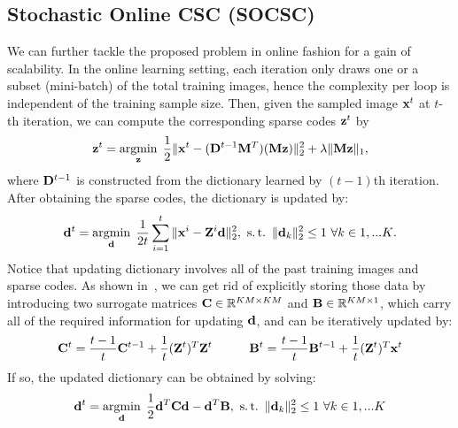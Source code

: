 \subsection{Stochastic Online CSC (SOCSC)}
We can further tackle the proposed problem in online fashion for a gain of scalability. In the online learning setting, each iteration only draws one or a subset (mini-batch) of the total training images, hence the complexity per loop is independent of the training sample size. Then, given the sampled image $\signal^t$ at $t$-th iteration, we can compute the corresponding sparse codes $\code^t$ by
\begin{equation} \label{eq:updatingCodeOnline}
    \code^t = \minimize{\code} \frac{1}{2}\|\signal^t - (\Filter^{t-1} \mask^T)(\mask \code) \|_2^2 + \lambda \|\mask \code\|_1,
\end{equation}
where $\Filter^{t-1}$ is constructed from the dictionary learned by $(t-1)$th iteration. After obtaining the sparse codes, the dictionary is updated by:
\begin{equation}
    \filter^t = \minimize{\filter} \frac{1}{2t}\sum_{i=1}^{t} \|\signal^i - \Code^i \filter \|_2^2, ~\subjectto ~ \|\filter_k\|^2_2 \leq 1 ~ \forall k \in {1,...K}.
\end{equation}
Notice that updating dictionary involves all of the past training images and sparse codes. As shown in~\cite{mairal2009online,mairal2010online}, we can get rid of explicitly storing those data by introducing two surrogate matrices $\surC \in \mathbb{R}^{KM \times KM}$ and $\surB \in \mathbb{R}^{KM \times 1}$, which carry all of the required information for updating $\filter$, and can be iteratively updated by:
\begin{equation} \label{eq:updateSur}
    \surC^t  = \frac{t-1}{t} \surC^{t-1} + \frac{1}{t}(\Code^t)^T\Code^t ~~~~~~~~~ \surB^t  = \frac{t-1}{t} \surB^{t-1} + \frac{1}{t}(\Code^t)^T\signal^t
\end{equation}
If so, the updated dictionary can be obtained by solving:
\begin{equation} \label{eq:updatingFilterOnline}
    \filter^t = \minimize{\filter} \frac{1}{2} \filter^T\surC\filter - \filter^T\surB, ~ \subjectto ~ \|\filter_k\|_2^2 \leq 1 ~ \forall k \in {1,...K}
\end{equation}

